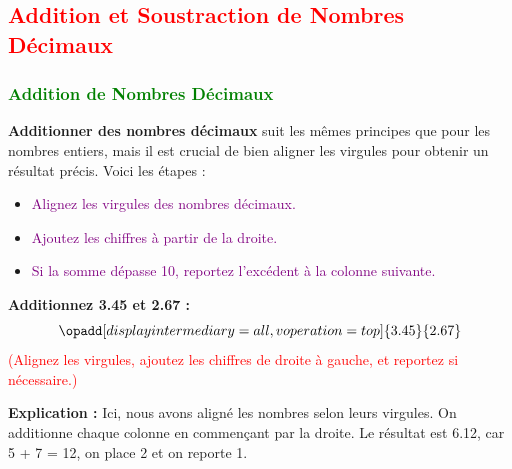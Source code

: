 \documentclass{article}
\begin{document}
\begin{center}

\captionsetup{justification=centering, font=small}
\end{center}

\subsection{\textcolor{red}{Addition et Soustraction de Nombres Décimaux}}

\subsubsection{\textcolor{green}{Addition de Nombres Décimaux}}

\vspace{0.25cm}

\textbf{Additionner des nombres décimaux} suit les mêmes principes que pour les nombres entiers, mais il est crucial de bien aligner les virgules pour obtenir un résultat précis. Voici les étapes :

    \begin{itemize}
        \item \textcolor{purple}{Alignez les virgules des nombres décimaux.}
        \item \textcolor{purple}{Ajoutez les chiffres à partir de la droite.}
        \item \textcolor{purple}{Si la somme dépasse 10, reportez l'excédent à la colonne suivante.}
    \end{itemize}

\vspace{0.2cm}

\begin{tcolorbox}[colback=orange!10!white, colframe=orange!75!black, sharp corners=south, boxrule=0.8mm, title=Exemple d'Addition]
    \textbf{Additionnez 3.45 et 2.67 :}
    \[
    \opadd[displayintermediary=all,voperation=top]{3.45}{2.67}
    \]
    \textcolor{red}{(Alignez les virgules, ajoutez les chiffres de droite à gauche, et reportez si nécessaire.)}
    
    \textbf{Explication :} Ici, nous avons aligné les nombres selon leurs virgules. On additionne chaque colonne en commençant par la droite. Le résultat est 6.12, car 5 + 7 = 12, on place 2 et on reporte 1.
\end{tcolorbox}
\end{document}
